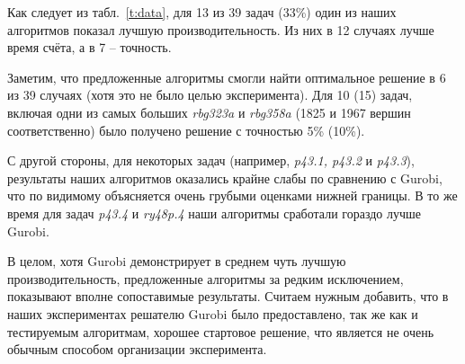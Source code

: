 Как следует из табл.~\ref{t:data},
для 13 из 39 задач (33\%)
один из наших алгоритмов
показал лучшую производительность.
Из них в 12 случаях лучше время счёта,
а в 7 -- точность.

Заметим, что предложенные алгоритмы
смогли найти оптимальное решение в 6 из 39 случаях
(хотя это не было целью эксперимента).
Для 10 (15) задач, включая одни из самых больших
{\it rbg323a} и {\it rbg358a}
(1825 и 1967 вершин соответственно)
было получено решение с точностью 5\% (10\%).


С другой стороны,
для некоторых задач
(например, {\it p43.1, p43.2} и {\it p43.3}),
результаты наших алгоритмов
оказались крайне слабы по сравнению с Gurobi,
что по видимому объясняется
очень грубыми оценками нижней границы.
В то же время для задач
{\it p43.4} и {\it ry48p.4}
наши алгоритмы сработали гораздо лучше Gurobi.

В целом, хотя Gurobi демонстрирует в среднем
чуть лучшую производительность,
предложенные алгоритмы за редким исключением,
показывают вполне сопоставимые результаты.
Считаем нужным добавить,
что в наших экспериментах
решателю Gurobi было предоставлено,
так же как и тестируемым алгоритмам,
хорошее стартовое решение,
что является не очень обычным способом
организации эксперимента.

